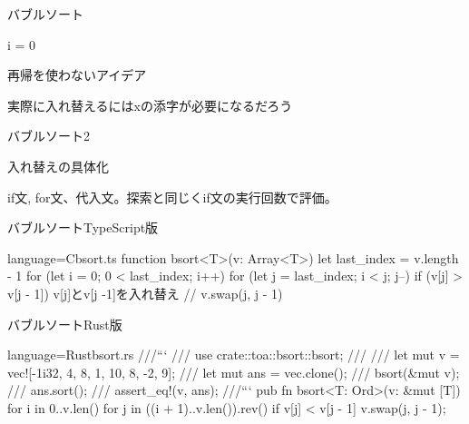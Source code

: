 \documentclass{beamer}
\begin{document}
\begin{frame}[fragile]{バブルソート}{}
\begin{algorithm}[H]
\BlankLine
i = 0
\caption[page]{再帰を使わないアイデア}
\end{algorithm}

実際に入れ替えるにはxの添字が必要になるだろう
\end{frame}

\begin{frame}[fragile]{バブルソート2}{}

\begin{algorithm}[H]
\BlankLine
{}
\caption[page]{入れ替えの具体化}
\end{algorithm}
\vfill
if文, for文、代入文。探索と同じくif文の実行回数で評価。
\end{frame}

\begin{frame}[fragile]{バブルソートTypeScript版}{}
\begin{codeof}{language=C}{bsort.ts}
function bsort<T>(v: Array<T>) {
  let last_index = v.length - 1
  for (let i = 0; 0 < last_index; i++) {
    for (let j = last_index; i < j; j--) {
      if (v[j] > v[j - 1]) {
        v[j]とv[j -1]を入れ替え // v.swap(j, j - 1)
      }
    }
  }
}
\end{codeof}
\end{frame}

\begin{frame}[fragile]{バブルソートRust版}{}
\begin{codeof}{language=Rust}{bsort.rs}
///```
/// use crate::toa::bsort::bsort;
///
/// let mut v = vec![-1i32, 4, 8, 1, 10, 8, -2, 9];
/// let mut ans = vec.clone();
/// bsort(&mut v);
/// ans.sort();
/// assert_eq!(v, ans);
///```
pub fn bsort<T: Ord>(v: &mut [T]) {
    for i in 0..v.len() {
        for j in ((i + 1)..v.len()).rev() {
            if v[j] < v[j - 1] {
                v.swap(j, j - 1);
            }
        }
    }
}
\end{codeof}
\end{frame}
\end{document}

